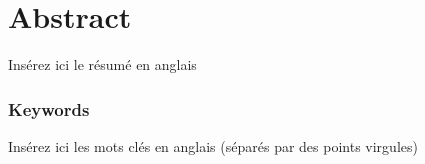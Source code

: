 
\chapter*{Abstract}%
\label{chap:abstract_en}

Insérez ici le résumé en anglais\\[2em]

\subsection*{Keywords}
Insérez ici les mots clés en anglais (séparés par des points virgules)


